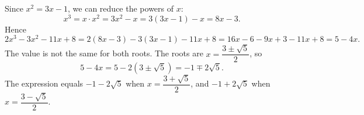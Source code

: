 Since $x^2=3x-1$, we can reduce the powers of $x$:
\[
x^3=x\cdot x^2=3x^2-x=3(3x-1)-x=8x-3 .
\]
Hence
\[
2x^3-3x^2-11x+8=2(8x-3)-3(3x-1)-11x+8=16x-6-9x+3-11x+8=5-4x .
\]
The value is not the same for both roots. The roots are $x=\dfrac{3\pm\sqrt5}{2}$, so
\[
5-4x=5-2\left(3\pm\sqrt5\right)=-1\mp2\sqrt5 .
\]
The expression equals $\boxed{-1-2\sqrt5}$ when $x=\dfrac{3+\sqrt5}{2}$, and $\boxed{-1+2\sqrt5}$ when $x=\dfrac{3-\sqrt5}{2}$.
